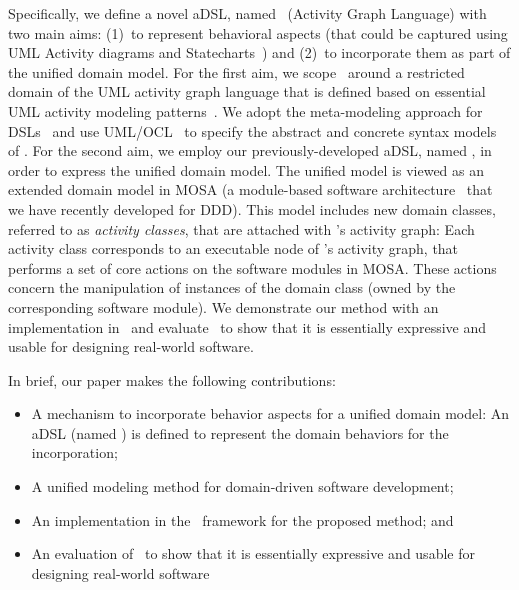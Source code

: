 Specifically, we define a novel aDSL, named \agl~(Activity Graph Language) with two main aims: (1)~to represent behavioral aspects (that could be captured using UML Activity diagrams and Statecharts~\cite{omg_unified_2017}) and (2)~to incorporate them as part of the unified domain model. %
For the first aim, we scope \agl~around a restricted domain of the UML activity graph language that is defined based on essential UML activity modeling patterns~\cite{omg_unified_2017}. We adopt the meta-modeling approach for DSLs~\cite{kleppe_software_2008} and use UML/OCL~\cite{omg_unified_2017, omg_object_2014} to specify the abstract and concrete syntax models of \agl. %
For the second aim, we employ our previously-developed aDSL, named \dcsl, in order to express the unified domain model. The unified model is viewed as an extended domain model in MOSA (a module-based software architecture~\cite{le_generative_2018} that we have recently developed for DDD). 
This model includes new domain classes, referred to as \textit{activity classes}, that are attached with \agl's activity graph: Each activity class corresponds to an executable node of \agl's activity graph, that performs a set of core actions on the software modules in MOSA. These actions concern the manipulation of instances of the domain class (owned by the corresponding software module). We demonstrate our method with an implementation in \jdomainapp~and evaluate \agl~to show that it is essentially expressive and usable for designing real-world software.

In brief, our paper makes the following contributions:
%
\begin{itemize}[leftmargin=*]
	\item A mechanism to incorporate behavior aspects for a unified domain model: An aDSL (named \agl) is defined to represent the domain behaviors for the incorporation;
	\item A unified modeling method for domain-driven software development;
	\item An implementation in the \jdomainapp~framework for the proposed method; and
	\item An evaluation of \agl~to show that it is essentially expressive and usable for designing real-world software
\end{itemize}

